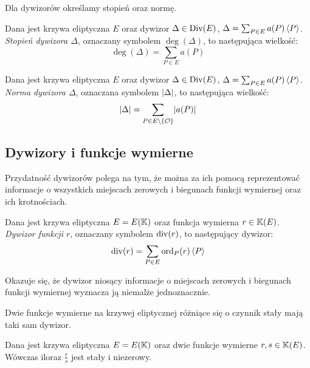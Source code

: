 Dla dywizorów określamy stopień oraz normę.

\begin{definition}
Dana jest krzywa eliptyczna $E$
oraz dywizor $\Delta \in \operatorname{Div}(E)$,
$\Delta = \linebreak \sum_{P \in E} a(P)\divi{P}$.
\emph{Stopień dywizora $\Delta$},
oznaczany symbolem $\deg(\Delta)$,
to następująca wielkość:
\begin{equation*}
\deg(\Delta) = \sum_{P \in E} a(P)
\end{equation*}
\end{definition}

\begin{definition}
Dana jest krzywa eliptyczna $E$
oraz dywizor $\Delta \in \operatorname{Div}(E)$,
$\Delta = \linebreak \sum_{P \in E} a(P)\divi{P}$.
\emph{Norma dywizora $\Delta$},
oznaczana symbolem $\lvert\Delta\rvert$,
to następująca wielkość:
\begin{equation*}
\lvert\Delta\rvert = \sum_{P \in E \setminus \{\mathcal{O}\}} \lvert a(P)\rvert
\end{equation*}
\end{definition}

\subsection*{Dywizory i funkcje wymierne}

Przydatność dywizorów polega na tym, że można za ich pomocą
reprezentować informacje
o wszystkich miejscach zerowych i biegunach funkcji wymiernej
oraz ich krotnościach.

\begin{definition}
Dana jest krzywa eliptyczna $E = E(\mathbb{K})$
oraz funkcja wymierna $r \in \mathbb{K}(E)$.
\emph{Dywizor funkcji $r$},
oznaczany symbolem $\operatorname{div}(r)$,
to następujący dywizor:
\begin{equation*}
\operatorname{div}(r) = \sum_{P \in E} \operatorname{ord}_P(r)\left\langle P\right\rangle
\end{equation*}
\end{definition}

Okazuje się, że dywizor niosący informacje o miejscach zerowych i biegunach
funkcji wymiernej wyznacza ją niemalże jednoznacznie.

\begin{fact}
Dwie funkcje wymierne na krzywej eliptycznej
różniące się o czynnik stały mają taki sam dywizor.
\end{fact}

\begin{theorem}
Dana jest krzywa eliptyczna $E = E(\mathbb{K})$
oraz dwie funkcje wymierne $r, s \in \mathbb{K}(E)$.
Wówczas iloraz $\frac{r}{s}$ jest stały i niezerowy.
\end{theorem}

